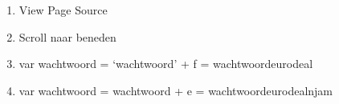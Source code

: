 \begin{enumerate}
  \item View Page Source
  \item Scroll naar beneden
  \item var wachtwoord = `wachtwoord' + f = wachtwoordeurodeal
  \item var wachtwoord = wachtwoord + e = wachtwoordeurodealnjam
\end{enumerate}